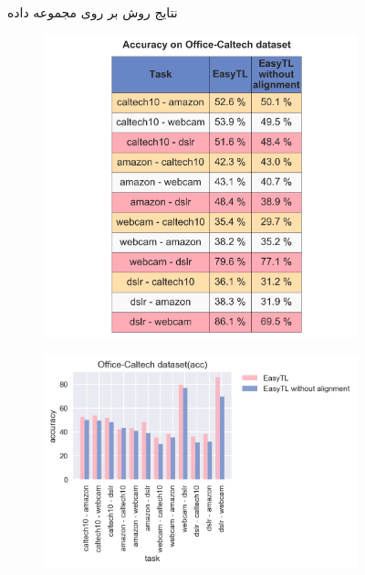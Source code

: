 \begin{figure}
\begin{subfigure}[b]{0.35\textwidth}
		\caption{}
	\end{subfigure}%
	\caption{
		نتایج روش
		بر روی مجموعه داده
		\textit{}
	}
	\label{fig:2}
\end{figure}

\begin{figure}
	\centering
	\begin{subfigure}[b]{0.25\textwidth}
		\centering
		\includegraphics[width=\linewidth]{images/3_1.jpg}
		\caption{}
	\end{subfigure}%
	\begin{subfigure}[b]{0.35\textwidth}
		\centering
		\includegraphics[width=\linewidth]{images/3_2.jpg}

\end{subfigure}
\end{figure}
